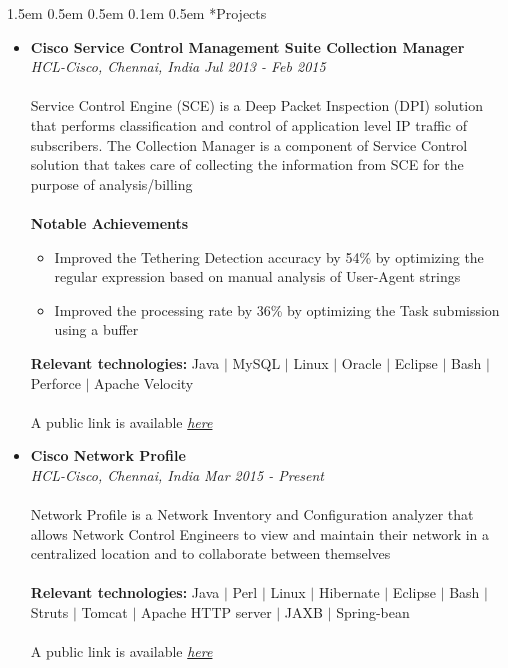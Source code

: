 \documentclass[a4paper, 12pt]{article}
\makeatletter
\renewcommand\section{\@startsection{section}{1}{\z@}%
                                  {1.5em \@plus 0.5em \@minus 0.5em}%
                                  {0.1em \@plus 0.5em}%
                                  {\small\bfseries\sc}}
\makeatother
\begin{document}
\section*{Projects}
\begin{adjustwidth}{1.3em}{0pt}
\begin{itemize}
  \item \textbf{Cisco Service Control Management Suite Collection Manager}\\
        \textsl{HCL-Cisco, Chennai, India} \hfill
        \emph{Jul 2013 - Feb 2015}\\
        \\
        Service Control Engine (SCE) is a Deep Packet Inspection (DPI) solution
        that performs classification and control of application level IP traffic
        of subscribers. The Collection Manager is a component of Service Control
        solution that takes care of collecting the information from SCE for the
        purpose of analysis/billing\\
        \\
        \textbf{\small{Notable Achievements}}
        \begin{itemize}
          \item Improved the Tethering Detection accuracy by 54\% by optimizing
                the regular expression based on manual analysis of User-Agent
                strings
          \item Improved the processing rate by 36\% by optimizing the Task
                submission using a buffer
        \end{itemize}
        \vspace{1em}
        \textbf{\small{Relevant technologies:}} Java $|$ MySQL $|$ Linux $|$
        Oracle $|$ Eclipse $|$ Bash $|$ Perforce $|$ Apache Velocity\\
        \\
        A public link is available \href{http://www.cisco.com/c/en/us/products/service-exchange/sce-8000-series-service}{\emph{here}}\\

  \item \textbf{Cisco Network Profile}\\
        \textsl{HCL-Cisco, Chennai, India} \hfill
        \emph{Mar 2015 - Present}\\
        \\
        Network Profile is a Network Inventory and Configuration analyzer that
        allows Network Control Engineers to view and maintain their network in a
        centralized location and to collaborate between themselves\\
        \\
        \textbf{\small{Relevant technologies:}} Java $|$ Perl $|$ Linux $|$
        Hibernate $|$ Eclipse $|$ Bash $|$ Struts $|$ Tomcat $|$ Apache HTTP
        server $|$ JAXB $|$ Spring-bean\\
        \\
        A public link is available \href{http://www.cisco.com/web/tsweb/tools/network-profile/index.html}{\emph{here}}
\end{itemize}
\end{adjustwidth}
\end{document}
